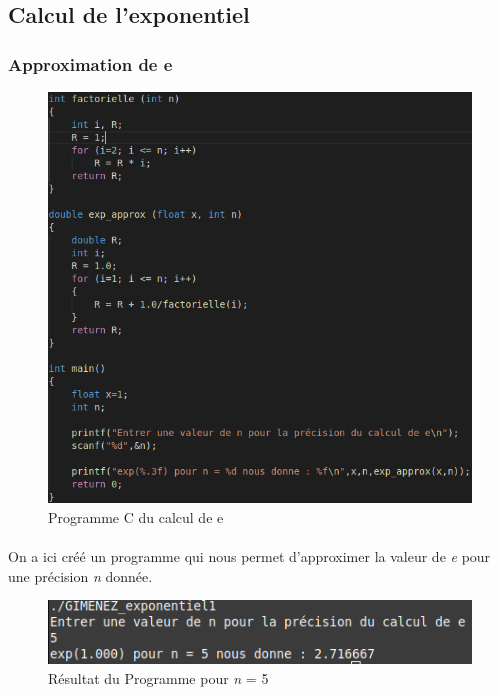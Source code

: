 \documentclass[10pt,a4paper]{article}
\begin{document}
\subsection{Calcul de l'exponentiel}
\subsubsection{Approximation de e}
	\begin{figure}[h]
	\begin{center}
	\includegraphics[scale=.3]{images/expo_1_c}
	\end{center}
	\caption{Programme C du calcul de e}
	\end{figure}
\paragraph{}
	On a ici créé un programme qui nous permet d'approximer la valeur de \emph{e} pour une précision \emph{n} donnée.
	\begin{figure}[h]
	\begin{center}
	\includegraphics[scale=.3]{images/expo_1_ex}
	\end{center}
	\caption{Résultat du Programme pour \emph{n} = 5}
	\end{figure}
\end{document}
